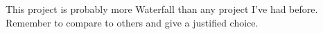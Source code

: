\documentclass[a4paper,10pt]{article}
\begin{document}
This project is probably more Waterfall than any project I've had before. Remember to compare to others and give a justified choice.

%	

	
	
	
	
	
	
\end{document}
